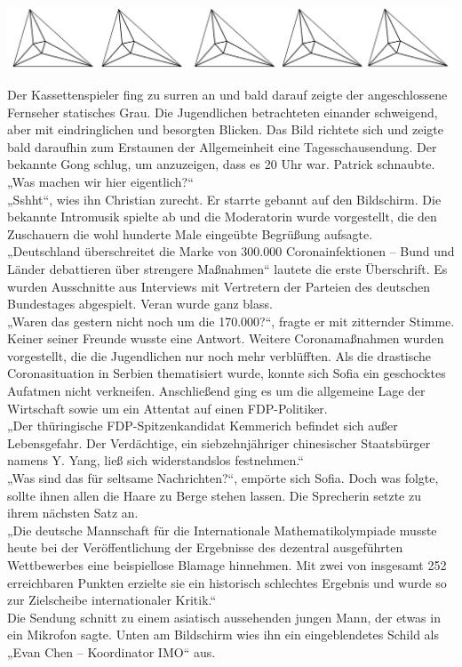 \documentclass[oneside]{memoir}
\newcommand{\parasep}{
\bigskip
\bigskip
\begin{center} 
   \includegraphics[scale=.08]{parasep5.jpg} 
\end{center}
\bigskip
\bigskip
}
\begin{document}
\parasep

\noindent Der Kassettenspieler fing zu surren an und bald darauf zeigte der angeschlossene Fernseher statisches Grau. Die Jugendlichen betrachteten einander schweigend, aber mit eindringlichen und besorgten Blicken. Das Bild richtete sich und zeigte bald daraufhin zum Erstaunen der Allgemeinheit eine Tagesschausendung. Der bekannte Gong schlug, um anzuzeigen, dass es 20 Uhr war. Patrick schnaubte.
„Was machen wir hier eigentlich?“ \\
„Sshht“, wies ihn Christian zurecht. Er starrte gebannt auf den Bildschirm. Die bekannte Intromusik spielte ab und die Moderatorin wurde vorgestellt, die den Zuschauern die wohl hunderte Male eingeübte Begrüßung aufsagte. \\
„Deutschland überschreitet die Marke von 300.000 Coronainfektionen – Bund und Länder debattieren über strengere Maßnahmen“ lautete die erste Überschrift. Es wurden Ausschnitte aus Interviews mit Vertretern der Parteien des deutschen Bundestages abgespielt. Veran wurde ganz blass. \\
„Waren das gestern nicht noch um die 170.000?“, fragte er mit zitternder Stimme. Keiner seiner Freunde wusste eine Antwort. Weitere Coronamaßnahmen wurden vorgestellt, die die Jugendlichen nur noch mehr verblüfften. Als die drastische Coronasituation in Serbien thematisiert wurde, konnte sich Sofia ein geschocktes Aufatmen nicht verkneifen. Anschließend ging es um die allgemeine Lage der Wirtschaft sowie um ein Attentat auf einen FDP-Politiker. \\
„Der thüringische FDP-Spitzenkandidat Kemmerich befindet sich außer Lebensgefahr. Der Verdächtige, ein siebzehnjähriger chinesischer Staatsbürger namens Y. Yang, ließ sich widerstandslos festnehmen.“ \\
„Was sind das für seltsame Nachrichten?“, empörte sich Sofia. Doch was folgte, sollte ihnen allen die Haare zu Berge stehen lassen. Die Sprecherin setzte zu ihrem nächsten Satz an. \\
„Die deutsche Mannschaft für die Internationale Mathematikolympiade musste heute bei der Veröffentlichung der Ergebnisse des dezentral ausgeführten Wettbewerbes eine beispiellose Blamage hinnehmen. Mit zwei von insgesamt 252 erreichbaren Punkten erzielte sie ein historisch schlechtes Ergebnis und wurde so zur Zielscheibe internationaler Kritik.“ \\
Die Sendung schnitt zu einem asiatisch aussehenden jungen Mann, der etwas in ein Mikrofon sagte. Unten am Bildschirm wies ihn ein eingeblendetes Schild als „Evan Chen – Koordinator IMO“ aus. \\
\end{document}
